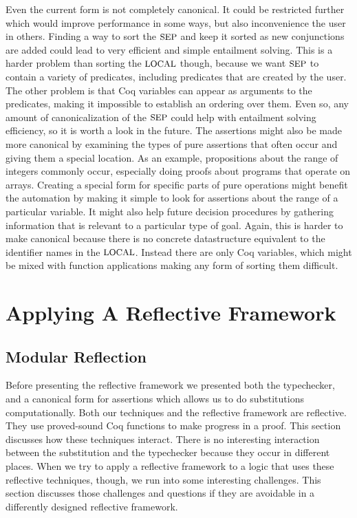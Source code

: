 \documentclass{puthesis}
\begin{document}
Even the current form is not completely canonical. It could be
restricted further which would improve performance in some ways, but
also inconvenience the user in others. Finding a way to sort the
$\mbox{\small SEP}$ and keep it sorted as new conjunctions are added could lead to
very efficient and simple entailment solving. This is a harder problem
than sorting the $\mbox{\small LOCAL}$ though, because we want $\mbox{\small SEP}$ to contain a
variety of predicates, including predicates that are created by the
user. The other problem is that Coq variables can appear as arguments
to the predicates, making it impossible to establish an ordering over
them. Even so, any amount of canonicalization of the $\mbox{\small SEP}$ could help
with entailment solving efficiency, so it is worth a look in the
future. The assertions might also be made more canonical by examining
the types of pure assertions that often occur and giving them a
special location. As an example, propositions about the range of
integers commonly occur, especially doing proofs about programs that
operate on arrays. Creating a special form for specific parts of pure
operations might benefit the automation by making it simple to look
for assertions about the range of a particular variable. It might also
help future decision procedures by gathering information that is
relevant to a particular type of goal. Again, this is harder to
make canonical because there is no concrete datastructure equivalent
to the identifier names in the $\mbox{\small LOCAL}$. Instead there are only Coq
variables, which might be mixed with function applications making any
form of sorting them difficult. 



\chapter{Applying A Reflective Framework}

\section{Modular Reflection}

Before presenting the reflective framework we presented both the
typechecker, and a canonical form for assertions which allows us to do
substitutions computationally.  Both our techniques and the reflective
framework are reflective.  They use proved-sound Coq functions to make
progress in a proof. This section discusses how these techniques
interact. There is no interesting interaction between the substitution
and the typechecker because they occur in different places. When we
try to apply a reflective framework to a logic that uses these
reflective techniques, though, we run into some interesting
challenges. This section discusses those challenges and questions if
they are avoidable in a differently designed reflective framework.
\end{document}
